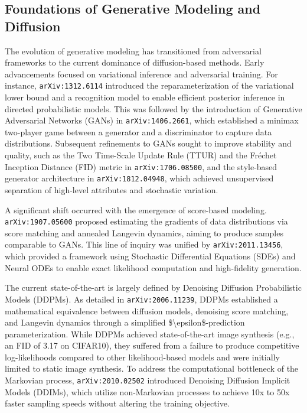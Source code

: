 \documentclass[11pt]{article}
\begin{document}
\subsection{Foundations of Generative Modeling and Diffusion}

The evolution of generative modeling has transitioned from adversarial frameworks to the current dominance of diffusion-based methods. Early advancements focused on variational inference and adversarial training. For instance, \texttt{arXiv:1312.6114} introduced the reparameterization of the variational lower bound and a recognition model to enable efficient posterior inference in directed probabilistic models. This was followed by the introduction of Generative Adversarial Networks (GANs) in \texttt{arXiv:1406.2661}, which established a minimax two-player game between a generator and a discriminator to capture data distributions. Subsequent refinements to GANs sought to improve stability and quality, such as the Two Time-Scale Update Rule (TTUR) and the Fréchet Inception Distance (FID) metric in \texttt{arXiv:1706.08500}, and the style-based generator architecture in \texttt{arXiv:1812.04948}, which achieved unsupervised separation of high-level attributes and stochastic variation.

A significant shift occurred with the emergence of score-based modeling. \texttt{arXiv:1907.05600} proposed estimating the gradients of data distributions via score matching and annealed Langevin dynamics, aiming to produce samples comparable to GANs. This line of inquiry was unified by \texttt{arXiv:2011.13456}, which provided a framework using Stochastic Differential Equations (SDEs) and Neural ODEs to enable exact likelihood computation and high-fidelity generation.

The current state-of-the-art is largely defined by Denoising Diffusion Probabilistic Models (DDPMs). As detailed in \texttt{arXiv:2006.11239}, DDPMs established a mathematical equivalence between diffusion models, denoising score matching, and Langevin dynamics through a simplified \$\textbackslash{}epsilon\$-prediction parameterization. While DDPMs achieved state-of-the-art image synthesis (e.g., an FID of 3.17 on CIFAR10), they suffered from a failure to produce competitive log-likelihoods compared to other likelihood-based models and were initially limited to static image synthesis. To address the computational bottleneck of the Markovian process, \texttt{arXiv:2010.02502} introduced Denoising Diffusion Implicit Models (DDIMs), which utilize non-Markovian processes to achieve 10x to 50x faster sampling speeds without altering the training objective.
\end{document}
